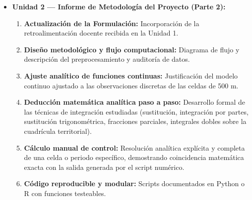 \documentclass[11pt,a4paper]{article}
\begin{document}
\begin{guidelinebox}[title=Estructura Acumulativa del Informe por Unidad]
\begin{itemize}[leftmargin=*,itemsep=3pt]
  \item \textbf{Unidad 2 — Informe de Metodología del Proyecto (Parte 2):}
  \begin{enumerate}[label=\alph*),itemsep=1.5pt]
    \item \textbf{Actualización de la Formulación:} Incorporación de la retroalimentación docente recibida en la Unidad 1.
    \item \textbf{Diseño metodológico y flujo computacional:} Diagrama de flujo y descripción del preprocesamiento y auditoría de datos.
    \item \textbf{Ajuste analítico de funciones continuas:} Justificación del modelo continuo ajustado a las observaciones discretas de las celdas de 500 m.
    \item \textbf{Deducción matemática analítica paso a paso:} Desarrollo formal de las técnicas de integración estudiadas (sustitución, integración por partes, sustitución trigonométrica, fracciones parciales, integrales dobles sobre la cuadrícula territorial).
    \item \textbf{Cálculo manual de control:} Resolución analítica explícita y completa de una celda o periodo específico, demostrando coincidencia matemática exacta con la salida generada por el script numérico.
    \item \textbf{Código reproducible y modular:} Scripts documentados en Python o R con funciones testeables.
  \end{enumerate}


\end{itemize}
\end{guidelinebox}
\end{document}
